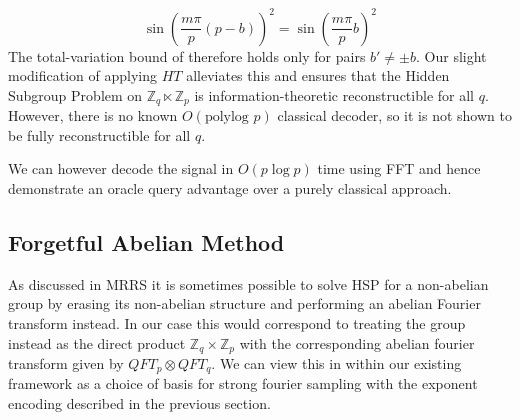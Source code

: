\begin{equation}
    \sin \left( \frac{m\pi}{p}(p-b)\right)^2 =\sin \left(\frac{m\pi}{p}b\right)^2
\end{equation}
The total-variation bound of \cite{moore2007power} therefore holds only for pairs $b' \neq \pm b$. Our slight modification of applying $HT$ alleviates this and ensures that the Hidden Subgroup Problem on $\mathbb{Z}_q \ltimes \mathbb{Z}_p$ is information-theoretic reconstructible for all $q$. However, there is no known $O(\text{polylog } p)$ classical decoder, so it is not shown to be fully reconstructible for all $q$.

We can however decode the signal in $O(p \log p)$ time using FFT and hence demonstrate an oracle query advantage over a purely classical approach.

\subsection{Forgetful Abelian Method}
\label{section:forgetful}
As discussed in MRRS it is sometimes possible to solve HSP for a non-abelian group by erasing its non-abelian structure and performing an abelian Fourier transform instead. In our case this would correspond to treating the group instead as the direct product $\mathbb{Z}_q \times \mathbb{Z}_p$ with the corresponding abelian fourier transform given by $QFT_p \otimes QFT_q$. We can view this in within our existing framework as a choice of basis for strong fourier sampling with the exponent encoding described in the previous section.

